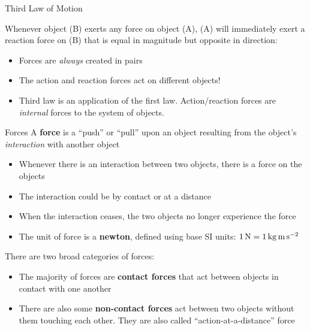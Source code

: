 \documentclass[12pt,compress,aspectratio=169]{beamer}
\begin{document}
\begin{frame}{Third Law of Motion}
  \begin{center}
  \end{center}

  Whenever object (B) exerts any force on object (A), (A) will immediately
  exert a reaction force on (B) that is equal in magnitude but opposite in
  direction:

  \begin{itemize}
  \item Forces are \emph{always} created in pairs
  \item The action and reaction forces act on different objects!
  \item Third law is an application of the first law. Action/reaction forces
    are \emph{internal} forces to the system of objects.
  \end{itemize}
\end{frame}



\begin{frame}{Forces}
  A \textbf{force} is a ``push'' or ``pull'' upon an object resulting from the
  object's \emph{interaction} with another object
  \begin{itemize}
  \item Whenever there is an interaction between two objects, there is a force
    on the objects
  \item The interaction could be by contact or at a distance
  \item When the interaction ceases, the two objects no longer experience the
    force
  \item The unit of force is a \textbf{newton}, defined using base SI units:
    $\SI1\newton=\SI1{\kilo\gram\metre\per\second\squared}$
  \end{itemize}
  There are two broad categories of forces:
  \begin{itemize}
  \item The majority of forces are \textbf{contact forces} that act between
    objects in contact with one another
  \item There are also some \textbf{non-contact forces} act between two objects
    without them touching each other. They are also called
    ``action-at-a-distance'' force
  \end{itemize}
\end{frame}
\end{document}
